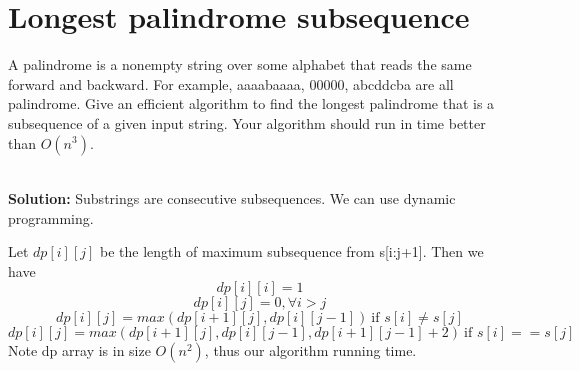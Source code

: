 \section{Longest palindrome subsequence}

A palindrome is a nonempty string over some alphabet that reads the same forward and backward. For example, aaaabaaaa, 00000, abcddcba are all palindrome. Give an efficient algorithm to find the longest palindrome that is a subsequence of a given input string. Your algorithm should run in time better than $O(n^3)$.

\ \\{\bf Solution:} Substrings are consecutive subsequences. We can use dynamic programming.

Let $dp[i][j]$ be the length of maximum subsequence from s[i:j+1]. Then we have 
\[ dp[i][i]=1 \]
\[ dp[i][j]=0, \forall i > j \]
\[ dp[i][j] = max(dp[i+1][j], dp[i][j-1]) \ \text{if } s[i]\ne s[j] \]
\[ dp[i][j] = max(dp[i+1][j], dp[i][j-1], dp[i+1][j-1]+2)\ \text{if }  s[i] == s[j]\]
Note dp array is in size $O(n^2)$, thus our algorithm running time.